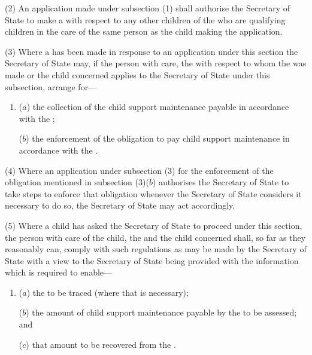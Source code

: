 \documentclass[a4paper]{article}
\begin{document}
(2)
An application made under subsection (1) shall authorise the 
Secretary of
State to make a 
with respect to
any other children of the 
who are qualifying
children in the care of the same person as the child making the application.

(3)
Where a 
has been made in
response to an application under this section the Secretary of State may, if the
person with care, the 
with respect to whom the
was made or the child concerned applies to 
the Secretary
of State under this subsection, arrange for---
\begin{enumerate}\item[]
($a$)
the collection of the child support maintenance payable in accordance
with the ;

($b$)
the enforcement of the obligation to pay child support maintenance in
accordance with the .
\end{enumerate}
	
(4)
Where an application under subsection (3) for the enforcement of the
obligation mentioned in subsection (3)($b$) authorises the Secretary of State to take
steps to enforce that obligation whenever the Secretary of State considers it
necessary to do so, the Secretary of State may act accordingly.

(5)
Where a child has asked the Secretary of State to proceed under this section,
the person with care of the child, the 
and the
child concerned shall, so far as they reasonably can, comply with such regulations as
may be made by the Secretary of State with a view to the Secretary of State being provided with the information which is required to enable---
\begin{enumerate}\item[]
($a$)
the 
to be traced (where that is necessary);

($b$)
the amount of child support maintenance payable by the 
to be assessed; and

($c$)
that amount to be recovered from the .
\end{enumerate}
\end{document}
